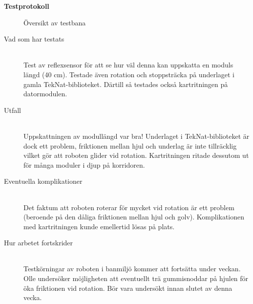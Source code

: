 \documentclass[11pt]{article}
\begin{document}
\begin{center}

{\Huge\bfseries Testprotokoll}
\vspace{4em}
\end{center}

\begin{flushleft}


\begin{figure}[htbp]
\centering
\noindent\resizebox{.4\linewidth}{!}{
	}
	\caption{Översikt av testbana\label{bana}}	
\end{figure}

\begin{description}
\item[Vad som har testats] \hfill \\
Test av reflexsensor för att se hur väl denna kan uppskatta en moduls längd (40 cm). Testade även rotation och stoppsträcka på underlaget i gamla TekNat-biblioteket. Därtill så testades också kartritningen på datormodulen. 
\vspace{1em}
\item[Utfall] \hfill \\
Uppskattningen av modullängd var bra! Underlaget i TekNat-biblioteket är dock ett problem, friktionen mellan hjul och underlag är inte tillräcklig vilket gör att roboten glider vid rotation. Kartritningen ritade dessutom ut för många moduler i djup på korridoren. 
\vspace{1em}
\item[Eventuella komplikationer] \hfill \\
Det faktum att roboten roterar för mycket vid rotation är ett problem (beroende på den dåliga friktionen mellan hjul och golv). Komplikationen med kartritningen kunde emellertid lösas på plats.
\vspace{1em}
\item[Hur arbetet fortskrider] \hfill \\
Testkörningar av roboten i banmiljö kommer att fortsätta under veckan. Olle undersöker möjligheten att eventuellt trä gummisnoddar på hjulen för öka friktionen vid rotation. Bör vara undersökt innan slutet av denna vecka.
\end{description}

\end{flushleft}
\end{document}
